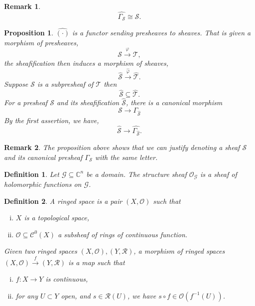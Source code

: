 \documentclass{article}
\newtheorem{proposition}{Proposition}[section]
\newtheorem{definition}{Definition}[section]
\newtheorem{remark}{Remark}[section]
\newcommand{\C}[0]{\mathbb{C}}
\newcommand{\G}[0]{\mathcal{G}}
\newcommand{\Ouv}[0]{\mathcal{O}}
\begin{document}
\begin{remark}
  \begin{equation*}
    \widehat{\Gamma_{\mathcal{S}}} \cong \mathcal{S}.
  \end{equation*}
\end{remark}

\begin{proposition}
  $\widehat{(\cdot)}$ is a functor sending presheaves to sheaves. That is given a morphism of presheaves,
  \begin{equation*}
    \mathcal{S}\stackrel{\varphi}{\to}\mathcal{T},
  \end{equation*}
  the sheafification then induces a morphism of sheaves,
  \begin{equation*}
    \widehat{\mathcal{S}}\stackrel{\widehat{\varphi}}{\to}\widehat{\mathcal{T}}.
  \end{equation*}
  Suppose $\mathcal{S}$ is a subpresheaf of $\mathcal{T}$ then 
  \begin{equation*}
    \widehat{\mathcal{S}}\subseteq\widehat{\mathcal{T}}.
  \end{equation*}
  For a presheaf $\mathcal{S}$ and its sheafification $\widehat{\mathcal{S}}$, there is a canonical morphism 
  \begin{equation*}
    \mathcal{S}\to\Gamma_{\widehat{\mathcal{S}}}
  \end{equation*}
  By the first assertion, we have,
  \begin{equation*}
    \widehat{\mathcal{S}}\to\widehat{\Gamma_{\widehat{\mathcal{S}}}}.
  \end{equation*}
\end{proposition}

\begin{remark}
  The proposition above shows that we can justify denoting a sheaf $\mathcal{S}$ and its canonical presheaf $\Gamma_{\mathcal{S}}$ with the same letter.
\end{remark}

\begin{definition}
  Let $\G\subseteq\C^n$ be a domain. The structure sheaf $\Ouv_\G$ is a sheaf of holomorphic functions on $\G$.
\end{definition}

\begin{definition}
  A ringed space is a pair $(X,\Ouv)$ such that 
  \begin{enumerate}[i).]
    \item $X$ is a topological space, 
    \item $\Ouv\subseteq\mathcal{C}^0(X)$ a subsheaf of rings of continuous function.
  \end{enumerate}
  Given two ringed spaces $(X,\Ouv),(Y,\mathcal{R})$, a morphism of ringed spaces $(X,\Ouv)\stackrel{f}{\to}(Y,\mathcal{R})$ is a map such that 
  \begin{enumerate}[i).]
    \item $f:X\to Y$ is continuous,
    \item for any $U\subset Y$ open, and $s\in\mathcal{R}(U)$, we have $s\circ f\in\Ouv(f^{-1}(U))$. 
  \end{enumerate}
\end{definition}
\end{document}
